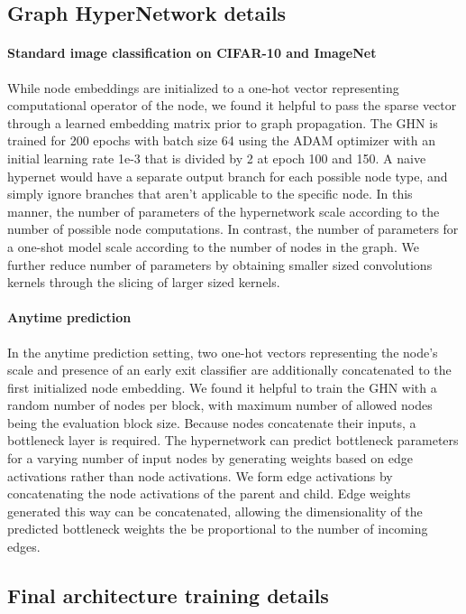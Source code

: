\subsection{Graph HyperNetwork details} 
\paragraph{Standard image classification on CIFAR-10 and ImageNet}
While node embeddings are initialized to a one-hot vector representing computational operator of the node, we found it helpful to pass the sparse vector through a learned embedding matrix  prior to graph propagation. The GHN is trained for 200 epochs  with batch size 64 using the ADAM optimizer with an initial learning rate 1e-3 that is divided by 2 at epoch 100 and 150. A naive hypernet would have a separate output branch for each possible node type, and simply ignore branches that aren't applicable to the specific node. In this manner, the number of parameters of the hypernetwork scale according to the number of possible node computations. In contrast, the number of parameters for a one-shot model scale according to the number of nodes in the graph. We further reduce number of parameters by obtaining smaller sized convolutions kernels through the slicing of larger sized kernels. 

\paragraph{Anytime prediction }
In the anytime prediction setting, two one-hot vectors representing the node's scale and presence of an early exit classifier are additionally concatenated to the first initialized node embedding. We found it helpful to train the GHN with a random number of nodes per block, with maximum number of allowed nodes being the evaluation block size. Because nodes concatenate their inputs, a bottleneck layer is required. The hypernetwork can predict bottleneck parameters for a varying number of input nodes by generating weights based on edge activations rather than node activations. We form edge activations by concatenating the node activations of the parent and child. Edge weights generated this way can be concatenated, allowing the dimensionality of the predicted bottleneck weights the be proportional to the number of incoming edges. 

\subsection{Final architecture training details} 
